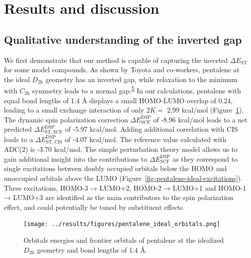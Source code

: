 \documentclass[
  number,
  3p]{elsarticle}
\newcommand{\DeltaE}[2][]{\Delta E^{\mathrm{#1}}_{\mathrm{#2}}}
\newcommand{\DeltaEST}[2][]{\Delta E^{\mathrm{#1}}_{\mathrm{ST,#2}}}
\begin{document}
\hypertarget{results-and-discussion}{%
\section{Results and discussion}\label{results-and-discussion}}

\hypertarget{qualitative-understanding-of-the-inverted-gap}{%
\subsection{Qualitative understanding of the inverted
gap}\label{qualitative-understanding-of-the-inverted-gap}}

We first demonstrate that our method is capable of capturing the
inverted \(\DeltaE{ST}\) for some model compounds. As shown by Toyota
and co-workers, pentalene at the ideal \(D_\mathrm{2h}\) geometry has an
inverted gap, while relaxation to the minimum with \(C_\mathrm{2h}\)
symmetry leads to a normal
gap.\textsuperscript{\protect\hyperlink{ref-kosekiViolationHundMultiplicity1985}{5}}
In our calculations, pentalene with equal bond lengths of 1.4 Å displays
a small HOMO-LUMO overlap of 0.24, leading to a small exchange
interaction of only \(2K=\) 2.99 kcal/mol
(Figure~\ref{fig-pentalene-ideal-orbitals}). The dynamic spin
polarization correction \(\DeltaE[DSP]{SCF}\) of -8.96 kcal/mol leads to
a net predicted \(\DeltaEST[DSP]{SCF}\) of -5.97 kcal/mol. Adding
additional correlation with CIS leads to a \(\DeltaEST[DSP]{CIS}\) of
-4.07 kcal/mol. The reference value calculated with ADC(2) is -3.70
kcal/mol. The simple perturbation theory model allows us to gain
additional insight into the contributions to \(\DeltaE[DSP]{SCF}\) as
they correspond to single excitations between doubly occupied orbitals
below the HOMO and unoccupied orbitals above the LUMO
(Figure~\ref{fig-pentalene-ideal-excitations}). Three excitations,
HOMO-3 → LUMO+2, HOMO-2 → LUMO+1 and HOMO-1 → LUMO+3 are identified as
the main contributors to the spin polarization effect, and could
potentially be tuned by substituent effects.

\begin{figure}

{\centering \texttt{[image: ../results/figures/pentalene\_ideal\_orbitals.png]}

}

\caption{\label{fig-pentalene-ideal-orbitals}Orbitals energies and
frontier orbitals of pentalene at the idealized \(D_\mathrm{2h}\)
geometry and bond lengths of 1.4 Å.}

\end{figure}
\end{document}
